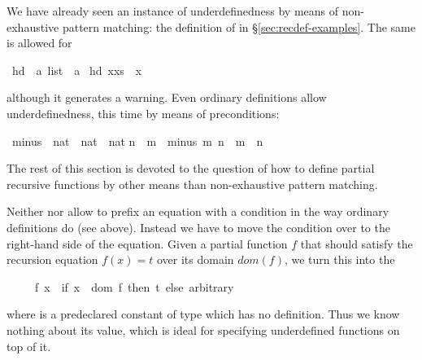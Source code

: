 \begin{isabellebody}
\begin{isamarkuptext}
We have already seen an instance of underdefinedness by means of
non-exhaustive pattern matching: the definition of  in
\S\ref{sec:recdef-examples}. The same is allowed for %
\end{isamarkuptext}%
\isamarkuptrue%
\isamarkupfalse%
\ hd\ {\isacharcolon}{\isacharcolon}\ {\isachardoublequoteopen}{\isacharprime}a\ list\ {\isasymRightarrow}\ {\isacharprime}a{\isachardoublequoteclose}\isanewline
{}\isamarkupfalse%
\ {\isachardoublequoteopen}hd\ {\isacharparenleft}x{\isacharhash}xs{\isacharparenright}\ {\isacharequal}\ x{\isachardoublequoteclose}%
\begin{isamarkuptext}%
\noindent
although it generates a warning.
Even ordinary definitions allow underdefinedness, this time by means of
preconditions:%
\end{isamarkuptext}%
\isamarkuptrue%
\isamarkupfalse%
\ minus\ {\isacharcolon}{\isacharcolon}\ {\isachardoublequoteopen}nat\ {\isasymRightarrow}\ nat\ {\isasymRightarrow}\ nat{\isachardoublequoteclose}\isanewline
{\isachardoublequoteopen}n\ {\isasymle}\ m\ {\isasymLongrightarrow}\ minus\ m\ n\ {\isasymequiv}\ m\ {\isacharminus}\ n{\isachardoublequoteclose}%
\begin{isamarkuptext}%
The rest of this section is devoted to the question of how to define
partial recursive functions by other means than non-exhaustive pattern
matching.%
\end{isamarkuptext}%
\isamarkuptrue%
%
\isamarkuptrue%
%
\begin{isamarkuptext}%
%
Neither  nor  allow to
prefix an equation with a condition in the way ordinary definitions do
(see  above). Instead we have to move the condition over
to the right-hand side of the equation. Given a partial function $f$
that should satisfy the recursion equation $f(x) = t$ over its domain
$dom(f)$, we turn this into the 
\begin{isabelle}%
\ \ \ \ \ f\ x\ {\isacharequal}\ {\isacharparenleft}if\ x\ {\isasymin}\ dom\ f\ then\ t\ else\ arbitrary{\isacharparenright}%
\end{isabelle}
where  is a predeclared constant of type 
which has no definition. Thus we know nothing about its value,
which is ideal for specifying underdefined functions on top of it.


\end{isamarkuptext}
\end{isabellebody}
